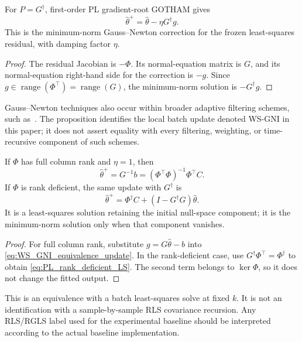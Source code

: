 \begin{proposition}
\label{prop:WS_GNI_equivalence}
For $P=G^\dagger$, first-order PL gradient-root GOTHAM gives
\begin{equation}
\label{eq:WS_GNI_equivalence_update}
    \hat\theta^+=\hat\theta-\eta G^\dagger g.
\end{equation}
This is the minimum-norm Gauss--Newton correction for the frozen
least-squares residual, with damping factor $\eta$.
\end{proposition}
\begin{proof}
The residual Jacobian is $-\Phi$. Its normal-equation matrix is $G$,
and its normal-equation right-hand side for the correction is $-g$.
Since $g\in\operatorname{range}(\Phi^\top)=\operatorname{range}(G)$,
the minimum-norm solution is $-G^\dagger g$.
\end{proof}

Gauss--Newton techniques also occur within broader adaptive filtering
schemes, such as~\cite{Wang2020}. The proposition identifies the local
batch update denoted WS-GNI in this paper; it does not assert equality
with every filtering, weighting, or time-recursive component of such
schemes.

\begin{corollary}
\label{cor:RGLS_relation}
If $\Phi$ has full column rank and $\eta=1$, then
\begin{equation}
\label{eq:RLS_relation_update}
    \hat\theta^+=G^{-1}b=(\Phi^\top\Phi)^{-1}\Phi^\top C.
\end{equation}
If $\Phi$ is rank deficient, the same update with $G^\dagger$ is
\begin{equation}
\label{eq:PL_rank_deficient_LS}
    \hat\theta^+=\Phi^\dagger C+(I-G^\dagger G)\hat\theta.
\end{equation}
It is a least-squares solution retaining the initial null-space component;
it is the minimum-norm solution only when that component vanishes.
\end{corollary}
\begin{proof}
For full column rank, substitute $g=G\hat\theta-b$ into
\eqref{eq:WS_GNI_equivalence_update}. In the rank-deficient case, use
$G^\dagger\Phi^\top=\Phi^\dagger$ to obtain
\eqref{eq:PL_rank_deficient_LS}. The second term belongs to
$\ker\Phi$, so it does not change the fitted output.
\end{proof}

This is an equivalence with a batch least-squares solve at fixed $k$.
It is not an identification with a sample-by-sample RLS covariance
recursion. Any RLS/RGLS label used for the experimental baseline should
be interpreted according to the actual baseline implementation.

